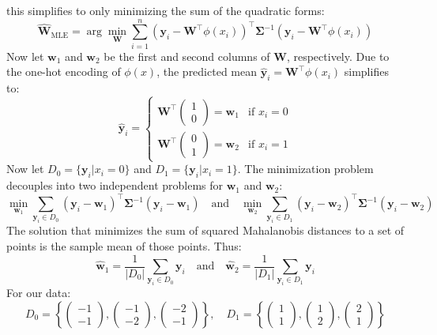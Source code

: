 \documentclass[11pt, a4paper, oneside]{memoir}
\begin{document}
this simplifies to only minimizing the sum of the quadratic forms:
\[ \hat{\mathbf{W}}_{\text{MLE}} = \arg\min_{\mathbf{W}} \sum_{i=1}^n (\mathbf{y}_i - \mathbf{W}^\top\phi(x_i))^\top\mathbf{\Sigma}^{-1}(\mathbf{y}_i - \mathbf{W}^\top\phi(x_i)) \]
Now let $\mathbf{w}_1$ and $\mathbf{w}_2$ be the first and second columns of $\mathbf{W}$, respectively.
Due to the one-hot encoding of $\phi(x)$, the predicted mean $\hat{\mathbf{y}}_i = \mathbf{W}^\top\phi(x_i)$ simplifies to:
\[
\hat{\mathbf{y}}_i = 
\begin{cases} 
    \mathbf{W}^\top\begin{pmatrix} 1 \\ 0 \end{pmatrix} = \mathbf{w}_1 & \text{if } x_i = 0 \\
    \mathbf{W}^\top\begin{pmatrix} 0 \\ 1 \end{pmatrix} = \mathbf{w}_2 & \text{if } x_i = 1 
\end{cases}
\]
Now let $D_0 = \{\mathbf{y}_i | x_i=0\}$ and $D_1 = \{\mathbf{y}_i | x_i=1\}$.
The minimization problem decouples into two independent problems for $\mathbf{w}_1$ and $\mathbf{w}_2$:
\[ \min_{\mathbf{w}_1} \sum_{\mathbf{y}_i \in D_0} (\mathbf{y}_i - \mathbf{w}_1)^\top\mathbf{\Sigma}^{-1}(\mathbf{y}_i - \mathbf{w}_1) \quad \text{and} \quad \min_{\mathbf{w}_2} \sum_{\mathbf{y}_i \in D_1} (\mathbf{y}_i - \mathbf{w}_2)^\top\mathbf{\Sigma}^{-1}(\mathbf{y}_i - \mathbf{w}_2) \]
The solution that minimizes the sum of squared Mahalanobis distances to a set of points is the sample mean of those points. Thus:
\[ \hat{\mathbf{w}}_1 = \frac{1}{|D_0|} \sum_{\mathbf{y}_i \in D_0} \mathbf{y}_i \quad \text{and} \quad \hat{\mathbf{w}}_2 = \frac{1}{|D_1|} \sum_{\mathbf{y}_i \in D_1} \mathbf{y}_i \]
For our data:
\[ D_0 = \left\{ \begin{pmatrix} -1 \\ -1 \end{pmatrix}, \begin{pmatrix} -1 \\ -2 \end{pmatrix}, \begin{pmatrix} -2 \\ -1 \end{pmatrix} \right\}, \quad D_1 = \left\{ \begin{pmatrix} 1 \\ 1 \end{pmatrix}, \begin{pmatrix} 1 \\ 2 \end{pmatrix}, \begin{pmatrix} 2 \\ 1 \end{pmatrix} \right\} \]
\end{document}
